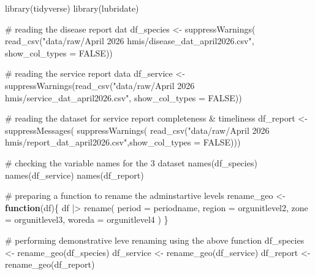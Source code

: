 \documentclass[
  letterpaper,
  DIV=11,
  numbers=noendperiod]{scrartcl}
\newenvironment{Shaded}{\begin{snugshade}}{\end{snugshade}}
\newcommand{\AttributeTok}[1]{\textcolor[rgb]{0.40,0.45,0.13}{#1}}
\newcommand{\CommentTok}[1]{\textcolor[rgb]{0.37,0.37,0.37}{#1}}
\newcommand{\ConstantTok}[1]{\textcolor[rgb]{0.56,0.35,0.01}{#1}}
\newcommand{\ControlFlowTok}[1]{\textcolor[rgb]{0.00,0.23,0.31}{\textbf{#1}}}
\newcommand{\FunctionTok}[1]{\textcolor[rgb]{0.28,0.35,0.67}{#1}}
\newcommand{\NormalTok}[1]{\textcolor[rgb]{0.00,0.23,0.31}{#1}}
\newcommand{\OtherTok}[1]{\textcolor[rgb]{0.00,0.23,0.31}{#1}}
\newcommand{\SpecialCharTok}[1]{\textcolor[rgb]{0.37,0.37,0.37}{#1}}
\newcommand{\StringTok}[1]{\textcolor[rgb]{0.13,0.47,0.30}{#1}}
\begin{document}
\begin{Shaded}
\begin{Highlighting}[]
\FunctionTok{library}\NormalTok{(tidyverse) }
\FunctionTok{library}\NormalTok{(lubridate)}

\CommentTok{\# reading the disease report dat}
\NormalTok{df\_species }\OtherTok{\textless{}{-}} \FunctionTok{suppressWarnings}\NormalTok{(}
  \FunctionTok{read\_csv}\NormalTok{(}\StringTok{"data/raw/April 2026 hmis/disease\_dat\_april2026.csv"}\NormalTok{, }\AttributeTok{show\_col\_types =} \ConstantTok{FALSE}\NormalTok{))}

\CommentTok{\# reading the service report data}
\NormalTok{df\_service }\OtherTok{\textless{}{-}} \FunctionTok{suppressWarnings}\NormalTok{(}\FunctionTok{read\_csv}\NormalTok{(}\StringTok{"data/raw/April 2026 hmis/service\_dat\_april2026.csv"}\NormalTok{, }\AttributeTok{show\_col\_types =} \ConstantTok{FALSE}\NormalTok{))}

\CommentTok{\# reading the dataset for service report completeness \& timeliness}
\NormalTok{df\_report }\OtherTok{\textless{}{-}}\FunctionTok{suppressMessages}\NormalTok{(}
  \FunctionTok{suppressWarnings}\NormalTok{(}
  \FunctionTok{read\_csv}\NormalTok{(}\StringTok{"data/raw/April 2026 hmis/report\_dat\_april2026.csv"}\NormalTok{,}\AttributeTok{show\_col\_types =} \ConstantTok{FALSE}\NormalTok{)))}

\CommentTok{\# checking the variable names for the 3 dataset}
\FunctionTok{names}\NormalTok{(df\_species)}
\FunctionTok{names}\NormalTok{(df\_service)}
\FunctionTok{names}\NormalTok{(df\_report)}

\CommentTok{\# preparing a function to rename the adminstartive levels }
\NormalTok{rename\_geo }\OtherTok{\textless{}{-}} \ControlFlowTok{function}\NormalTok{(df)\{}
\NormalTok{  df }\SpecialCharTok{|\textgreater{}}
    \FunctionTok{rename}\NormalTok{(}
      \AttributeTok{period =}\NormalTok{ periodname,}
      \AttributeTok{region =}\NormalTok{ orgunitlevel2,}
      \AttributeTok{zone   =}\NormalTok{ orgunitlevel3,}
      \AttributeTok{woreda =}\NormalTok{ orgunitlevel4}
\NormalTok{    )}
\NormalTok{\}}

\CommentTok{\# performing demonstrative leve renaming using the above function}
\NormalTok{df\_species }\OtherTok{\textless{}{-}} \FunctionTok{rename\_geo}\NormalTok{(df\_species)}
\NormalTok{df\_service }\OtherTok{\textless{}{-}} \FunctionTok{rename\_geo}\NormalTok{(df\_service)}
\NormalTok{df\_report  }\OtherTok{\textless{}{-}} \FunctionTok{rename\_geo}\NormalTok{(df\_report)}
\end{Highlighting}
\end{Shaded}
\end{document}
